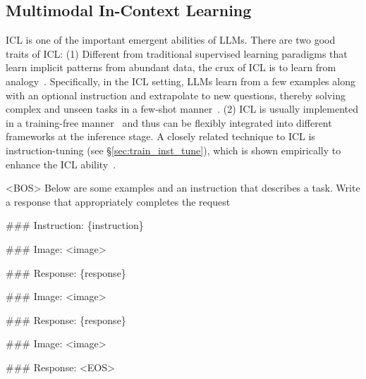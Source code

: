 \subsection{Multimodal In-Context Learning}
\label{sec:micl}

ICL is one of the important emergent abilities of LLMs. 
There are two good traits of ICL: 
(1) Different from traditional supervised learning paradigms that learn implicit patterns from abundant data, the crux of ICL is to learn from analogy~\cite{dong2022survey}. Specifically, in the ICL setting, LLMs learn from a few examples along with an optional instruction and extrapolate to new questions, thereby solving complex and unseen tasks in a few-shot manner~\cite{chameleon, mm-react, visprog}. 
(2) ICL is usually implemented in a training-free manner~\cite{dong2022survey} and thus can be flexibly integrated into different frameworks at the inference stage.
A closely related technique to ICL is instruction-tuning (see \S \ref{sec:train_inst_tune}), which is shown empirically to enhance the ICL ability~\cite{wei2021finetuned}. 


\begin{table}[!t]
\begin{tcolorbox}%


\textcolor[rgb]{0,0.7,0}{<BOS>} Below are some examples and an instruction that describes a task. Write a response that appropriately completes the request \par\medskip

\#\#\# Instruction: \textcolor[rgb]{0,0,0.8}{\{instruction\}}

\#\#\# Image: \textcolor[rgb]{0,0,0.8}{<image>}\ 

\#\#\# Response: \textcolor[rgb]{0.8,0,0}{\{response\}} \par\medskip


\#\#\# Image: \textcolor[rgb]{0,0,0.8}{<image>}\ 

\#\#\# Response: \textcolor[rgb]{0.8,0,0}{\{response\}}


\tcblower %

\#\#\# Image: \textcolor[rgb]{0,0,0.8}{<image>}\ 

\#\#\# Response: \textcolor[rgb]{0.8,0,0}{<EOS>}

\end{tcolorbox}
\caption{A simplified example of the template to structure an M-ICL query, adapted from~\cite{multimodal-gpt}. For illustration, we list two in-context examples and a query divided by a dashed line. 
\textcolor[rgb]{0,0,0.8}{\{instruction\}} and \textcolor[rgb]{0.8,0,0}{\{response\}} are texts from the data sample.  \textcolor[rgb]{0,0,0.8}{<image>} is a placeholder to represent the multimodal input (an image in this case). \textcolor[rgb]{0,0.7,0}{<BOS>} and \textcolor[rgb]{0.8,0,0}{<EOS>} are tokens denoting the start and the end of the input to the LLM, respectively.}
\label{template_ICL}
\end{table}

